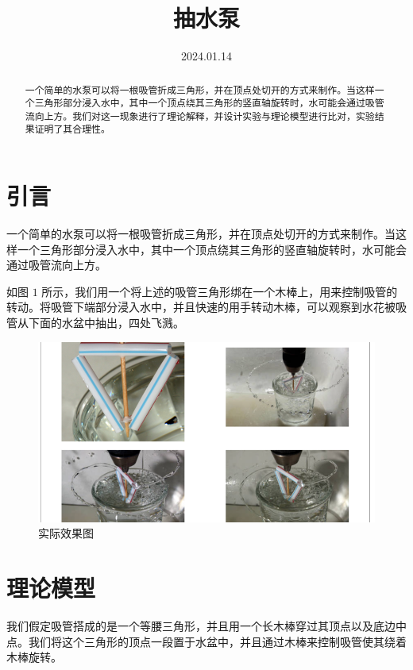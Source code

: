 \documentclass[fontset=windows]{article}
\title{\heiti\zihao{2} 抽水泵}
\date{2024.01.14}
\begin{document}
	\maketitle

\begin{abstract} 
    一个简单的水泵可以将一根吸管折成三角形，并在顶点处切开的方式来制作。当这样一个三角形部分浸入水中，其中一个顶点绕其三角形的竖直轴旋转时，水可能会通过吸管流向上方。我们对这一现象进行了理论解释，并设计实验与理论模型进行比对，实验结果证明了其合理性。
\end{abstract}

\tableofcontents

\newpage

\section{引言}

一个简单的水泵可以将一根吸管折成三角形，并在顶点处切开的方式来制作。当这样一个三角形部分浸入水中，其中一个顶点绕其三角形的竖直轴旋转时，水可能会通过吸管流向上方。

如图 $1$ 所示，我们用一个将上述的吸管三角形绑在一个木棒上，用来控制吸管的转动。将吸管下端部分浸入水中，并且快速的用手转动木棒，可以观察到水花被吸管从下面的水盆中抽出，四处飞溅。

\begin{figure}[htbp]
    \centering
    \includegraphics[scale=0.5]{7.png}
    \caption{实际效果图}
    \label{1}
\end{figure}


\section{理论模型}

我们假定吸管搭成的是一个等腰三角形，并且用一个长木棒穿过其顶点以及底边中点。我们将这个三角形的顶点一段置于水盆中，并且通过木棒来控制吸管使其绕着木棒旋转。
\end{document}
